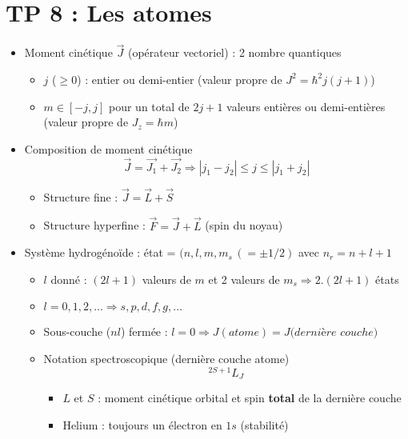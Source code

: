 
\section*{TP 8 : Les atomes}
\begin{itemize}
	\item Moment cinétique $\vec{J}$ (opérateur vectoriel) : 2 nombre quantiques
	      \begin{itemize}
	      	\item $j$ ($\geq 0$) : entier ou demi-entier (valeur propre de $J^2 = \hbar ^2 j(j+1)$)
	      	\item $m \in [-j,j]$ pour un total de $2j +1$ valeurs entières ou demi-entières (valeur propre de $J_z = \hbar m$)
	      \end{itemize}
	      		
	\item Composition de moment cinétique
	      \begin{equation}
	      	\vec{J} = \vec{J_1}+\vec{J_2} \Rightarrow |j_1-j_2| \leq j \leq |j_1+j_2|
	      \end{equation}
	      \begin{itemize}
	      	\item Structure fine : $\vec{J}=\vec{L}+\vec{S}$
	      	\item Structure hyperfine : $\vec{F} = \vec{J}+\vec{L}$ (spin du noyau)
	      \end{itemize}
	      	
	\item Système hydrogénoïde : état = $(n,l,m,m_s \, (= \pm 1/2)$ avec $n_r = n+l+1$
	      \begin{itemize}
	      	\item $l$ donné : $(2l+1)$ valeurs de $m$ et 2 valeurs de $m_s \Rightarrow 2.(2l+1)$ états
	      	      		
	      	\item $l = 0,1,2, \dots \Rightarrow s,p,d,f,g,\dots$
	      	      		
	      	\item Sous-couche ($nl$) fermée : $l = 0 \Rightarrow J(atome) = J(dernière$ $couche)$
	      	      		
	      	\item Notation spectroscopique (dernière couche atome)
	      	      \begin{equation}
	      	      	^{2S+1}L_J
	      	      \end{equation}
	      	      \begin{itemize}
	      	      	\item $L$ et $S$ : moment cinétique orbital et spin \textbf{total} de la dernière couche
	      	      	      			
	      	      	\item Helium : toujours un électron en $1s$ (stabilité)
	      	      \end{itemize}
	      \end{itemize}
\end{itemize}
